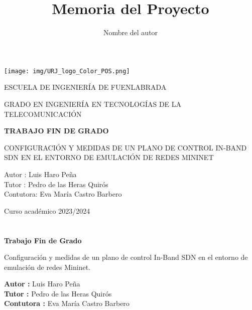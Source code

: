 \documentclass[a4paper, 12pt]{book}
\title{Memoria del Proyecto}
\author{Nombre del autor}
\begin{document}
	
	\renewcommand{\refname}{Bibliografía}  %
	\renewcommand{\appendixname}{Apéndice}
	
	
	
	\begin{titlepage}
		\begin{center}
			\texttt{[image: img/URJ\_logo\_Color\_POS.png]}
			
			\vspace{1.75cm}
			
			\LARGE
			ESCUELA DE INGENIERÍA DE FUENLABRADA
			\vspace{1cm}
			
			\LARGE
			GRADO EN INGENIERÍA EN TECNOLOGÍAS DE LA TELECOMUNICACIÓN
			
			\vspace{1cm}
			\LARGE
			\textbf{TRABAJO FIN DE GRADO}
			
			\vspace{1cm}
			
			\Large
			CONFIGURACIÓN Y MEDIDAS DE UN PLANO DE CONTROL IN-BAND SDN EN EL ENTORNO DE EMULACIÓN DE REDES MININET
			
			\vspace{2cm}
			
			\large
			Autor : Luis Haro Peña \\
			Tutor : Pedro de las Heras Quirós\\
			Contutora: Eva María Castro Barbero
			\vspace{1cm}
			
			\large
			Curso académico 2023/2024
			
		\end{center}
	\end{titlepage}
	
	\newpage
	\mbox{}
	\thispagestyle{empty} %
	
	
	
	\clearpage
	\chapter*{}
	
	\vspace{-4cm}
	\begin{center}
		\LARGE
		\textbf{Trabajo Fin de Grado}
		
		\vspace{1cm}
		\large
		Configuración y medidas de un plano de control In-Band SDN en el entorno de emulación de redes Mininet.
		
		\vspace{1cm}
		\large
		\textbf{Autor :} Luis Haro Peña \\
		\textbf{Tutor :} Pedro de las Heras Quirós \\
		\textbf{Contutora :} Eva María Castro Barbero
		
	\end{center}
	
\end{document}
